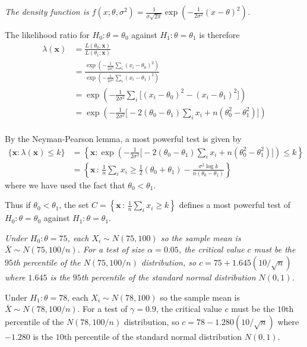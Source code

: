 \begin{exercise}
\begin{questions}
\begin{answer}
\ben
\it %
The density function is $f(x;\theta,\sigma^2) = \displaystyle\frac{1}{\sigma\sqrt{2\pi}}\exp\left(-\frac{1}{2\sigma^2}(x-\theta)^2\right)$. 

The likelihood ratio for $H_0:\theta=\theta_0$ against $H_1:\theta=\theta_1$ is therefore
\begin{align*}
\lambda(\mathbf{x})
	& = \frac{L(\theta_0;\mathbf{x})}{L(\theta_1;\mathbf{x})} \\
	& = \frac{\exp\left(-\frac{1}{2\sigma^2}\sum_i (x_i-\theta_0)^2\right)}{\exp\left(-\frac{1}{2\sigma^2}\sum_i(x_i-\theta_1)^2\right)} \\
	& = \exp\left(-\frac{1}{2\sigma^2}\sum_i\big[(x_i-\theta_0)^2 -(x_i-\theta_1)^2\big]\right) \\
	& = \exp\left(-\frac{1}{2\sigma^2}\big[-2(\theta_0-\theta_1)\sum_i x_i + n(\theta_0^2-\theta_1^2)\big]\right) \\
\end{align*}	

By the Neyman-Pearson lemma, a most powerful test is given by 
\begin{align*}
\{\mathbf{x}:\lambda(\mathbf{x})\leq k\}
	& = \left\{\mathbf{x}:\exp\left(-\frac{1}{2\sigma^2}\big[-2(\theta_0-\theta_1)\sum_i x_i + n(\theta_0^2-\theta_1^2)\big]\right)\leq k\right\} \\
	& = \left\{\mathbf{x}\,:\,\frac{1}{n}\sum_i x_i \geq \frac{1}{2}(\theta_0+\theta_1) - \frac{\sigma^2\log k}{n(\theta_0-\theta_1)}\right\}
\end{align*}
where we have used the fact that $\theta_0 < \theta_1$.

\bigskip
Thus if $\theta_0<\theta_1$, the set $\displaystyle C=\left\{\mathbf{x}\,:\,\frac{1}{n}\sum_i x_i\geq k\right\}$ defines a most powerful test of $H_0:\theta=\theta_0$ against $H_1:\theta=\theta_1$.

\it %
Under $H_0:\theta=75$, each $X_i\sim N(75,100)$ so the sample mean is $\bar{X}\sim N(75,100/n)$. For a test of size $\alpha=0.05$, the critical value $c$ must be the $95$th percentile of the $N(75,100/n)$ distribution, so $c = 75 + 1.645(10/\sqrt{n})$ where $1.645$ is the $95$th percentile of the standard normal distribution $N(0,1)$.

Under $H_1:\theta=78$, each $X_i\sim N(78,100)$ so the sample mean is $\bar{X}\sim N(78,100/n)$. For a test of $\gamma = 0.9$, the critical value $c$ must be the $10$th percentile of the $N(78,100/n)$ distribution, so $c = 78 - 1.280(10/\sqrt{n})$ where $-1.280$ is the $10$th percentile of the standard normal distribution $N(0,1)$.


\end{answer}
\end{questions}
\end{exercise}
